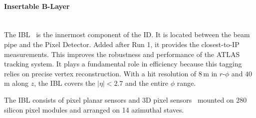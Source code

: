\paragraph{Insertable B-Layer}\mbox{}\\
\label{sec:Chap2:ID:B-Layer}
The IBL~\cite{Capeans:1291633} is the innermost component of the ID. It is located between the beam pipe and
the Pixel Detector.  Added after Run 1, it provides the closest-to-IP measurements. This improves the robustness 
and performance of the ATLAS tracking system. It plays a fundamental role in \btag
efficiency because this tagging relies on precise vertex reconstruction. %
With a hit resolution of $8\,$\textmu m in $r$-$\phi$ and $40\,$\textmu m along $z$, the IBL covers the $|\eta| < 2.7$ and the entire $\phi$ range.

The IBL consists of pixel planar sensors and 3D pixel sensors~\cite{Capeans:1291633, LaRosa:2016nbd} mounted on 
280 silicon pixel modules and arranged on 14 azimuthal staves.



